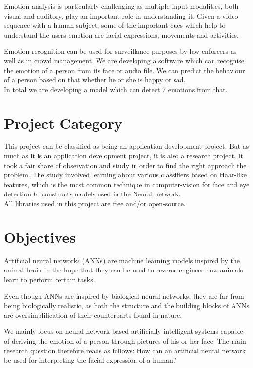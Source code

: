Emotion analysis is particularly challenging as multiple input modalities, both visual and auditory, play an important role in understanding it. Given a video sequence with a human subject, some of the important cues which help to understand the users emotion are facial expressions, movements and activities.

Emotion recognition can be used for surveillance purposes by law enforcers as well as in crowd management. We are developing a software which can recognise the emotion of a person from its face or audio file. We can predict the behaviour of a person based on that whether he or she is happy or sad.\\
In total we are developing a model which can detect 7 emotions from that.

\section{Project Category}
This project can be classified as being an application development project. But as much as it is an application development project, it is also a research project. It took a fair share of observation and study in order to find the right approach the problem. The study involved learning about various classifiers based on Haar-like features, which is the most common technique in computer-vision for face and eye detection to constructs models used in the Neural network.
\\
All libraries used in this project are free and/or open-source.

\section{Objectives}
Artificial neural networks (ANNs) are machine learning models inspired by the animal brain in the hope that they can be used to reverse engineer how animals learn to perform certain tasks.

Even though ANNs are inspired by biological neural networks, they are far from being biologically realistic, as both the structure and the building blocks of ANNs are oversimplification of their counterparts found in nature.

We mainly focus on neural network based artificially intelligent systems capable of deriving the emotion of a person through pictures of his or her face. The main research question therefore reads as follows: How can an artificial neural network be used for interpreting the facial expression of a human? 